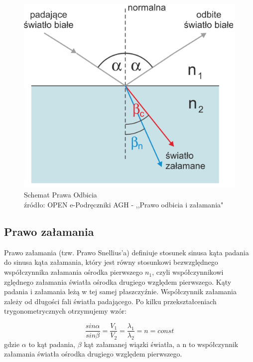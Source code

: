 \documentclass[a4paper,12pts]{article}
\begin{document}
	\begin{figure}[!h]
		\centering
		\includegraphics[scale=0.25]{odbicie.png}
		\caption{Schemat Prawa Odbicia \\ źródło: OPEN e-Podręczniki AGH - ,,Prawo odbicia i załamania"}
		\label{odbicie}
	\end{figure}
	
	\subsection{Prawo załamania}
	
	Prawo załamania (tzw. Prawo Snellius'a) definiuje stosunek sinusa kąta padania do sinusa kąta załamania, który jest równy stosunkowi bezwzględnego współczynnika załamania ośrodka pierwszego $n_1$, czyli współczynnikowi zględnego załamania światła ośrodka drugiego względem pierwszego. Kąty padania i załamania leżą w tej samej płaszczyźnie. Współczynnik załamania zależy od długości fali światła padającego. Po kilku przekształceniach trygonometrycznych otrzymujemy wzór:
	
	\begin{equation}
	\frac{sin\alpha}{sin\beta} = \frac{V_1}{V_2} = \frac{\lambda_1}{\lambda_2} = n = const
	\end{equation} 
	gdzie $\alpha$ to kąt padania, $\beta$ kąt załamanej wiązki światła, a n to współczynnik załamania światła ośrodka drugiego względem pierwszego.
	
	
\end{document}
